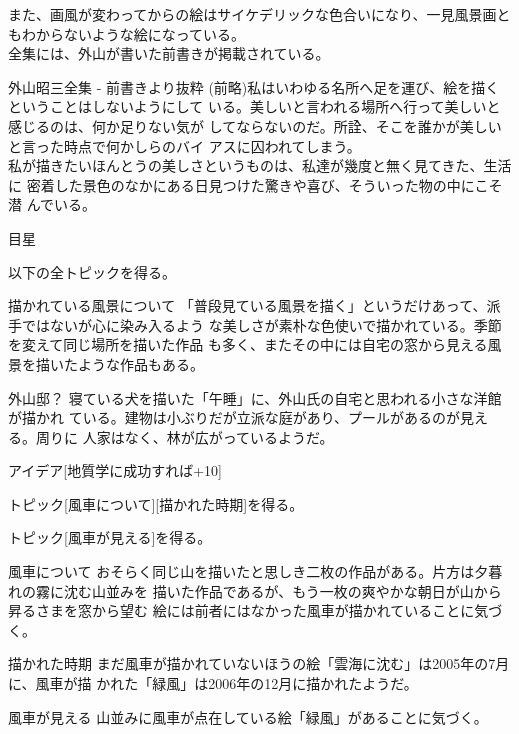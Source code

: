 \documentclass[a4paper,8pt,min]{jsarticle}
\begin{document}
また、画風が変わってからの絵はサイケデリックな色合いになり、一見風景画と
もわからないような絵になっている。\\

全集には、外山が書いた前書きが掲載されている。

\begin{itembox}{外山昭三全集 - 前書きより抜粋}
 (前略)私はいわゆる名所へ足を運び、絵を描くということはしないようにして
 いる。美しいと言われる場所へ行って美しいと感じるのは、何か足りない気が
 してならないのだ。所詮、そこを誰かが美しいと言った時点で何かしらのバイ
 アスに囚われてしまう。\\
 私が描きたいほんとうの美しさというものは、私達が幾度と無く見てきた、生活に
 密着した景色のなかにある日見つけた驚きや喜び、そういった物の中にこそ潜
 んでいる。
\end{itembox}

\begin{judge}{目星}
 \item 以下の全トピックを得る。
\end{judge}

\begin{topic}
 \item[描かれている風景について]
 「普段見ている風景を描く」というだけあって、派手ではないが心に染み入るよう
 な美しさが素朴な色使いで描かれている。季節を変えて同じ場所を描いた作品
 も多く、またその中には自宅の窓から見える風景を描いたような作品もある。 

 \item[外山邸？]
 寝ている犬を描いた「午睡」に、外山氏の自宅と思われる小さな洋館が描かれ
 ている。建物は小ぶりだが立派な庭があり、プールがあるのが見える。周りに
 人家はなく、林が広がっているようだ。

\end{topic}

\begin{judge}{アイデア[地質学に成功すれば+10]}
 \item トピック[風車について][描かれた時期]を得る。
 \item トピック[風車が見える]を得る。
\end{judge}

\begin{topic}
 \item[風車について]
 おそらく同じ山を描いたと思しき二枚の作品がある。片方は夕暮れの霧に沈む山並みを
 描いた作品であるが、もう一枚の爽やかな朝日が山から昇るさまを窓から望む
 絵には前者にはなかった風車が描かれていることに気づく。


 \item[描かれた時期]
 まだ風車が描かれていないほうの絵「雲海に沈む」は2005年の7月に、風車が描
 かれた「緑風」は2006年の12月に描かれたようだ。

 \item[風車が見える]
 山並みに風車が点在している絵「緑風」があることに気づく。
\end{topic}
\newpage
\end{document}
